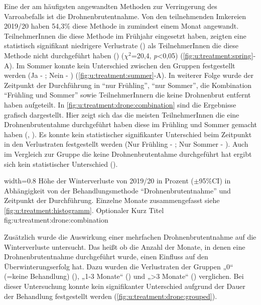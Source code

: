 Eine der am häufigsten angewandten Methoden zur Verringerung des Varroabefalls ist die Drohnenbrutentnahme. Von den teilnehmenden Imkereien 2019/20 haben 54,3\% diese Methode in zumindest einem Monat angewandt. TeilnehmerInnen die diese Methode im Frühjahr eingesetzt haben, zeigten eine statistisch signifikant niedrigere Verlustrate () als TeilnehmerInnen die diese Methode nicht durchgeführt haben () ($\chi^{2}$=20,4, \textit{p}<0,05) (\cref{fig:u:treatment:spring}-A). Im Sommer konnte kein Unterschied zwischen den Gruppen festgestellt werden (Ja - ; Nein - ) (\cref{fig:u:treatment:summer}-A).
\newline
In weiterer Folge wurde der Zeitpunkt der Durchführung in \enquote{nur Frühling}, \enquote{nur Sommer}, die Kombination \enquote{Frühling und Sommer} sowie TeilnehmerInnern die keine Drohnenbrut entfernt haben aufgeteilt. In \cref{fig:u:treatment:drone:combination} sind die Ergebnisse grafisch dargestellt. Hier zeigt sich das die meisten TeilnehmerInnen die eine Drohnenbrutentahme durchgeführt haben diese im Frühling und Sommer gemacht haben (, ). Es konnte kein statistischer signifikanter Unterschied beim Zeitpunkt in den Verlustraten festgestellt werden (Nur Frühling - ; Nur Sommer - ). Auch im Vergleich zur Gruppe die keine Drohnenbrutentahme durchgeführt hat ergibt sich kein statistischer Unterschied (). 

{width=0.8\textwidth} %
{Höhe der Winterverluste von 2019/20 in Prozent ($\pm$95\%CI) in Abhängigkeit von der Behandlungsmethode \enquote{Drohnenbrutentnahme} und Zeitpunkt der Durchführung. Einzelne Monate zusammengefasst siehe \cref{fig:u:treatment:histogramm}.} %
{Optionaler Kurz Titel} %
{fig:u:treatment:drone:combination} %

Zusätzlich wurde die Auswirkung einer mehrfachen Drohnenbrutentnahme auf die Winterverluste untersucht. Das heißt ob die Anzahl der Monate, in denen eine Drohnenbrutentnahme durchgeführt wurde, einen Einfluss auf den Überwinterungserfolg hat. Dazu wurden die Verlustraten der Gruppen „0`` (=keine Behandlung) (), „1-3 Monate`` () und „>3 Monate`` () verglichen. Bei dieser Untersuchung konnte kein signifikanter Unterschied aufgrund der Dauer der Behandlung festgestellt werden (\cref{fig:u:treatment:drone:grouped}). 

